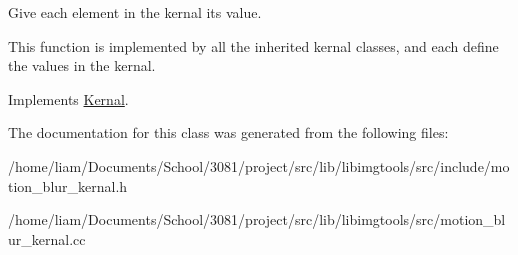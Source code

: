 Give each element in the kernal it\textquotesingle{}s value. 

This function is implemented by all the inherited kernal classes, and each define the values in the kernal. 

Implements \hyperlink{classKernal_a487ef0e4a0d37cb827b5c46750330952}{Kernal}.



The documentation for this class was generated from the following files\+:\begin{DoxyCompactItemize}
\item 
/home/liam/\+Documents/\+School/3081/project/src/lib/libimgtools/src/include/motion\+\_\+blur\+\_\+kernal.\+h\item 
/home/liam/\+Documents/\+School/3081/project/src/lib/libimgtools/src/motion\+\_\+blur\+\_\+kernal.\+cc\end{DoxyCompactItemize}
